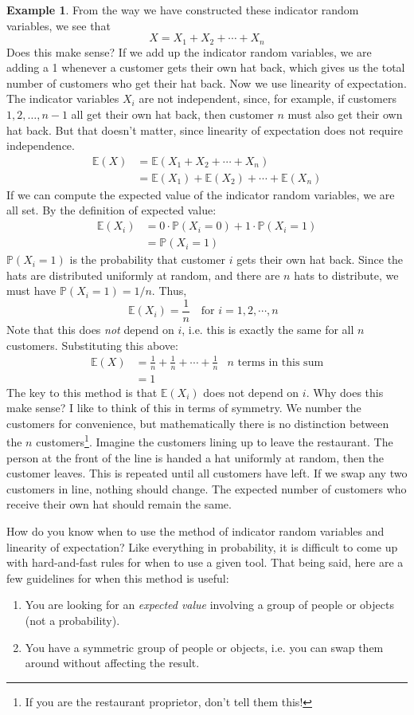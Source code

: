 \documentclass[12pt]{article}
\theoremstyle{definition}
\newtheorem*{example}{Example}
\theoremstyle{remark}
\def\P{{\mathbb P}}
\def\E{{\mathbb E}}
\begin{document}
\begin{example}
From the way we have constructed these indicator random variables, we see that
\[
X = X_1 + X_2 + \cdots + X_n
\]
Does this make sense? If we add up the indicator random variables, we are adding a 1 whenever a customer gets their own hat back, which gives us the total number of customers who get their hat back. Now we use linearity of expectation. The indicator variables $X_i$ are not independent, since, for example, if customers $1, 2, \dots, n-1$ all get their own hat back, then customer $n$ must also get their own hat back. But that doesn't matter, since linearity of expectation does not require independence.
\begin{align*}
\E(X) &= \E(X_1 + X_2 + \cdots + X_n) \\
&= \E(X_1) + \E(X_2) + \cdots + \E(X_n)
\end{align*}
If we can compute the expected value of the indicator random variables, we are all set. By the definition of expected value:
\begin{align*}
\E(X_i) &= 0 \cdot \P(X_i = 0) + 1 \cdot \P(X_i = 1) \\
&= \P(X_i = 1)
\end{align*}
$\P(X_i = 1)$ is the probability that customer $i$ gets their own hat back. Since the hats are distributed uniformly at random, and there are $n$ hats to distribute, we must have $\P(X_i = 1) = 1/n$. Thus,
\[
\E(X_i) = \frac{1}{n} \:\:\:\text{ for $i = 1, 2, \cdots, n$ }
\]
Note that this does \emph{not} depend on $i$, i.e. this is exactly the same for all $n$ customers. Substituting this above:
\begin{align*}
\E(X) &= \frac{1}{n} + \frac{1}{n} + \cdots + \frac{1}{n} &\text{$n$ terms in this sum}\\
&= 1
\end{align*}
The key to this method is that $\E(X_i)$ does not depend on $i$. Why does this make sense? I like to think of this in terms of symmetry. We number the customers for convenience, but mathematically there is no distinction between the $n$ customers\footnote{If you are the restaurant proprietor, don't tell them this!}. Imagine the customers lining up to leave the restaurant. The person at the front of the line is handed a hat uniformly at random, then the customer leaves. This is repeated until all customers have left. If we swap any two customers in line, nothing should change. The expected number of customers who receive their own hat should remain the same.
\end{example}

How do you know when to use the method of indicator random variables and linearity of expectation? Like everything in probability, it is difficult to come up with hard-and-fast rules for when to use a given tool. That being said, here are a few guidelines for when this method is useful:
\begin{enumerate}
\item You are looking for an \emph{expected value} involving a group of people or objects (not a probability).
\item You have a symmetric group of people or objects, i.e. you can swap them around without affecting the result.
\end{enumerate}
\end{document}
